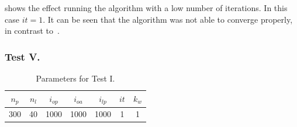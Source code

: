  shows the effect running the algorithm with a low number of iterations. In this case $it=1$. It can be seen that the algorithm was not able to converge properly, in contrast to~.

\subsubsection{Test V.}
\label{sec:test-v}

\begin{table}[htbp!]
    \centering
    \begin{tabular}{|c|c|c|c|c|c|c|}
        \hline
        $n_p$ & $n_l$ & $i_{op}$ & $i_{oa}$ & $i_{lp}$ & $it$ & $k_w$\\
        \hline \hline
        300 & 40 & 1000 & 1000 & 1000 & 1 & 1\\
        \hline 
    \end{tabular}
    \caption{Parameters for Test I.}
    \label{tab:test-v}
\end{table}

